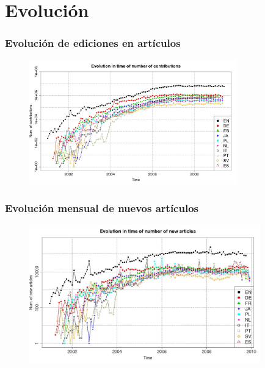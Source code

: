 \section{Evolución}


\begin{frame}
\frametitle{Evolución de ediciones en artículos}

\begin{figure}[htp]
\centering
\includegraphics[width=9cm]{figs/contribs.jpg}
\end{figure}

\end{frame}



\begin{frame}
\frametitle{Evolución mensual de nuevos artículos}

\begin{figure}[htp]
\centering
\includegraphics[width=10cm]{figs/newArticles.jpg}
\end{figure}

\end{frame}


